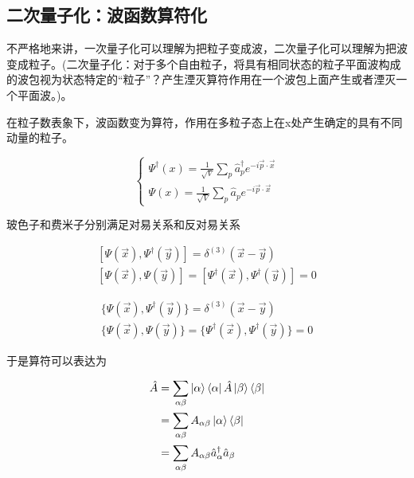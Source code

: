 \subsection{二次量子化：波函数算符化}

不严格地来讲，一次量子化可以理解为把粒子变成波，二次量子化可以理解为把波变成粒子。(二次量子化：对于多个自由粒子，将具有相同状态的粒子平面波构成的波包视为状态特定的“粒子”？产生湮灭算符作用在一个波包上面产生或者湮灭一个平面波。)。

在粒子数表象下，波函数变为算符，作用在多粒子态上在x处产生确定的具有不同动量的粒子。

\begin{equation}
	\left\{
	\begin{array}{lr}
		\Psi^\dagger(x)=\frac{1}{\sqrt{V}}\sum_{p}\hat{a}_p^\dagger e^{-i\vec{p}\cdot\vec{x}} \\
		\Psi(x)=\frac{1}{\sqrt{V}}\sum_{p}\hat{a}_pe^{-i\vec{p}\cdot\vec{x}}
	\end{array}
	\right.
\end{equation}

玻色子和费米子分别满足对易关系和反对易关系

\begin{equation}
	\begin{split}
		[\Psi(\vec{x}),\Psi^\dagger(\vec{y})]=\delta^{(3)}(\vec{x}-\vec{y}) \\
		[\Psi(\vec{x}),\Psi(\vec{y})]=[\Psi^\dagger(\vec{x}),\Psi^\dagger(\vec{y})]=0
	\end{split}
\end{equation}

\begin{equation}
	\begin{array}{lr}
		\{\Psi(\vec{x}),\Psi^\dagger(\vec{y})\}=\delta^{(3)}(\vec{x}-\vec{y}) \\
		\{\Psi(\vec{x}),\Psi(\vec{y})\}=\{\Psi^\dagger(\vec{x}),\Psi^\dagger(\vec{y})\}=0
	\end{array}
\end{equation}

于是算符可以表达为

\begin{equation}
	\begin{split}
		\hat{A} &= \sum_{\alpha\beta}\ket{\alpha}\bra{\alpha}\hat{A}\ket{\beta}\bra{\beta} \\
			&= \sum_{\alpha\beta}A_{\alpha\beta}\ket{\alpha}\bra{\beta} \\
			&= \sum_{\alpha\beta}A_{\alpha\beta}\hat{a}_\alpha^\dagger\hat{a}_\beta
	\end{split}
\end{equation}

